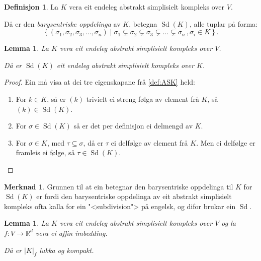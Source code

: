 \documentclass[a4paper, 12pt, norsk]{article}
\theoremstyle{plain}
\newtheorem{lemma}[theorem]{Lemma}
\theoremstyle{definition}
\newtheorem{definition}[theorem]{Definisjon}
\newtheorem{remark}[theorem]{Merknad}
\newcommand{\Rb}{\mathbb{R}}
\newcommand{\gr}[1]{ \lvert #1 \rvert } %
\newcommand{\set}[1]{ \left\{ #1 \right\} } %
\newcommand{\tuple}[1]{ \left( #1 \right) } %
\DeclareMathOperator{\Sd}{Sd} %
\begin{document}
\begin{definition}
	La \( K \) vera eit endeleg abstrakt simplisielt kompleks over \( V \). 
	
	Då er den \emph{barysentriske oppdelinga} av \( K \), betegna \( \Sd(K) \), alle tuplar på forma: 
	\[
		\set{(\sigma_1, \sigma_2, \sigma_3, \dots, \sigma_n) \mid \sigma_1 \subsetneq \sigma_2 \subsetneq \sigma_3 \subsetneq \dots \subsetneq \sigma_n\,, \sigma_i \in K}.
	\]
\end{definition}

\begin{lemma} \label{thm:subdivisjon-abstrakt-simplisielt-kompleks}
	La \( K \) vera eit endeleg abstrakt simplisielt kompleks over \( V \).
	
	Då er \( \Sd(K) \) eit endeleg abstrakt simplisielt kompleks over \( K \).
\end{lemma}

\begin{proof}
	Ein må visa at dei tre eigenskapane frå \autoref{def:ASK} held:
	\begin{enumerate}
		\item{ For \( k \in K \), så er \( \tuple{k} \) trivielt ei streng følga av element frå \( K \), så \( \tuple{k} \in \Sd(K) \). }
  		\item{ For \( \sigma \in \Sd(K) \) så er det per definisjon ei delmengd av \( K \). }
    	\item{ For \( \sigma \in K \), med \( \tau \subseteq \sigma \), då er \( \tau \) ei delfølge av element frå \( K \). Men ei delfølge er framleis ei følge, så \( \tau \in \Sd(K) \). }
	\end{enumerate}
\end{proof}

\begin{remark}
	Grunnen til at ein betegnar den barysentriske oppdelinga til \( K \) for \( \Sd(K) \) er fordi den barysentriske oppdelinga av eit abstrakt simplisielt kompleks ofta kalla for ein "<subdivision"> på engelsk, og difor brukar ein \( \Sd \).
\end{remark}

\begin{lemma} \label{thm:geometrisk-kompleks-lukka}
	La \( K \) vera eit endeleg abstrakt simplisielt kompleks over \( V \) og la \( f: V \to \Rb^d \) vera ei affin imbedding.
	
	Då er \( \gr{K}_f \) lukka og kompakt.
\end{lemma}
\end{document}
